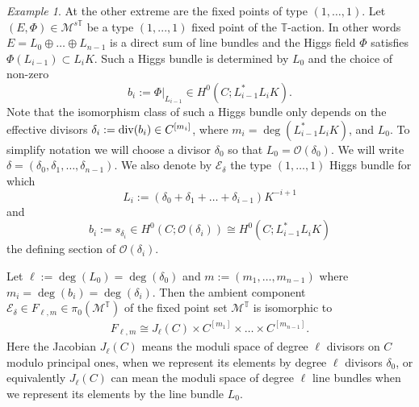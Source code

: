 \documentclass[12pt]{article}
\numberwithin{equation}{section}
\renewcommand{\div}{{\rm div}}
\theoremstyle{remark}
\newtheorem{example}[theorem]{Example}
\theoremstyle{definition}
\numberwithin{theorem}{section}
\def\beq{\begin{eqnarray}}
\def\eeq{\end{eqnarray}}
\def\calE{{\mathcal E}}
\def\M{{\mathcal{M}}}
\newcommand{\T}{{\mathbb{T}}}
\def\calO{{\mathcal O}}
\def\bb{{\mathbf{b}}}
\def\d{{{\delta}}}
\def\mm{{{\ell,m}}}
\renewcommand{\1}{\mathbbm{1}}
\begin{document}
\begin{example}	\label{ex111} At the other extreme are the fixed points of type $(1,\dots,1)$. Let $(E,\Phi)\in \M^{s\T}$ be a type $(1,...,1)$ fixed point of the $\T$-action. In other words $E=L_0\oplus\dots \oplus L_{n-1}$ is a direct sum of line bundles and the Higgs field $\Phi$ satisfies $\Phi(L_{i-1})\subset L_{i}K$. Such a Higgs bundle is determined by $L_0$ and the choice of non-zero  $$b_i:=\Phi|_{L_{i-1}}\in H^0(C;L_{i-1}^*L_{i}K).$$ Note that the isomorphism class of such a Higgs bundle only depends on the effective divisors $\delta_i:=\div(b_i)\in C^{[m_i]}$, where $m_i=\deg(L_{i-1}^*L_{i}K)$, and $L_0$. To simplify notation we will choose a divisor $\delta_0$ so that $L_0=\calO(\delta_0)$. We will write $\delta=(\delta_0,\delta_1,\dots,\delta_{n-1})$. We also denote by $\calE_{\d}$ the type $(1,\dots,1)$ Higgs bundle for which $$L_i:=(\delta_0+\delta_1+\dots+\delta_{i-1})K^{-i+1}$$ and  $$b_i:=s_{\delta_i}\in H^0(C;\calO(\delta_i))\cong H^0(C;L_{i-1}^*L_{i}K)$$ the defining section of $\calO(\delta_i)$. 
	
	
	Let $\ell:=\deg(L_0)=\deg(\delta_0)$ and  $m:=(m_1,\dots,m_{n-1})$ where $m_i=\deg(b_i)=\deg(\delta_i)$. Then the ambient component $\calE_{\d}\in F_{\mm}\in \pi_0(\M^\T)$ of the fixed point set $\M^\T$ is isomorphic to  \beq\label{type111fix}F_{\mm}\cong J_\ell(C)\times C^{[m_1]}\times \dots \times C^{[m_{n-1}]}.\eeq Here the Jacobian $J_\ell(C)$ means the moduli space of degree $\ell$ divisors on $C$ modulo principal ones, when we represent its elements by degree $\ell$ divisors $\delta_0$, or equivalently $J_\ell(C)$ can mean the moduli space of degree $\ell$ line bundles when we represent its elements by the line bundle $L_0$. 
\end{example}
\end{document}
